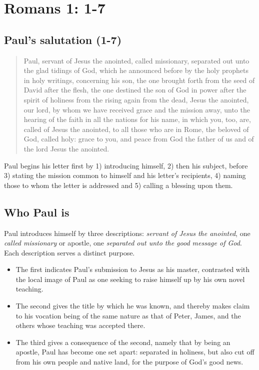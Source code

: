 \chapter{Romans 1: 1-7}
\section{Paul's salutation (1-7)}
\begin{quote}
	Paul, servant of Jesus the anointed, called missionary, separated out unto the glad tidings of God, which he announced before by the holy prophets in holy writings, concerning his son, the one brought forth from the seed of David after the flesh, the one destined the son of God in power after the spirit of holiness from the rising again from the dead, Jesus the anointed, our lord, by whom we have received grace and the mission away, unto the hearing of the faith in all the nations for his name, in which you, too, are, called of Jesus the anointed, to all those who are in Rome, the beloved of God, called holy: grace to you, and peace from God the father of us and of the lord Jesus the anointed.
\end{quote}

Paul begins his letter first by 1) introducing himself, 2) then his subject, before 3) stating the mission common to himself and his letter's recipients, 4) naming those to whom the letter is addressed and 5) calling a blessing upon them. 

\section{Who Paul is}
Paul introduces himself by three descriptions: \emph{servant of Jesus the anointed}, one \emph{called missionary} or apostle, one \emph{separated out unto the good message of God}. Each description serves a distinct purpose. 
\begin{itemize}
	\item The first indicates Paul's submission to Jesus as his master, contrasted with the local image of Paul as one seeking to raise himself up by his own novel teaching. 
	\item The second gives the title by which he was known, and thereby makes claim to his vocation being of the same nature as that of Peter, James, and the others whose teaching was accepted there.
	\item The third gives a consequence of the second, namely that by being an apostle, Paul has become one set apart: separated in holiness, but also cut off from his own people and native land, for the purpose of God's good news. 
\end{itemize}



